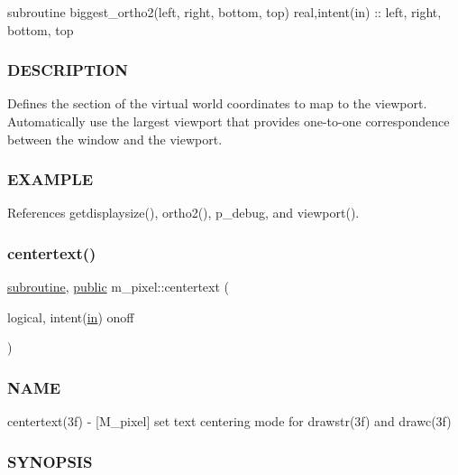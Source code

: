 subroutine biggest\+\_\+ortho2(left, right, bottom, top) real,intent(in) \+:\+: left, right, bottom, top

\subsubsection*{D\+E\+S\+C\+R\+I\+P\+T\+I\+ON}

Defines the section of the virtual world coordinates to map to the viewport. Automatically use the largest viewport that provides one-\/to-\/one correspondence between the window and the viewport.

\subsubsection*{E\+X\+A\+M\+P\+LE}

References getdisplaysize(), ortho2(), p\+\_\+debug, and viewport().

\mbox{\label{namespacem__pixel_a9ddc8e8604bbc3181c728f08a6b87904}} 
\subsubsection{\texorpdfstring{centertext()}{centertext()}}
{\footnotesize\ttfamily \hyperlink{M__stopwatch_83_8txt_acfbcff50169d691ff02d4a123ed70482}{subroutine}, \hyperlink{M__stopwatch_83_8txt_a2f74811300c361e53b430611a7d1769f}{public} m\+\_\+pixel\+::centertext (\begin{DoxyParamCaption}\item[{logical, intent(\hyperlink{M__journal_83_8txt_afce72651d1eed785a2132bee863b2f38}{in})}]{onoff }\end{DoxyParamCaption})}



\subsubsection*{N\+A\+ME}

centertext(3f) -\/ \mbox{[}M\+\_\+pixel\mbox{]} set text centering mode for drawstr(3f) and drawc(3f) 

\subsubsection*{S\+Y\+N\+O\+P\+S\+IS}

